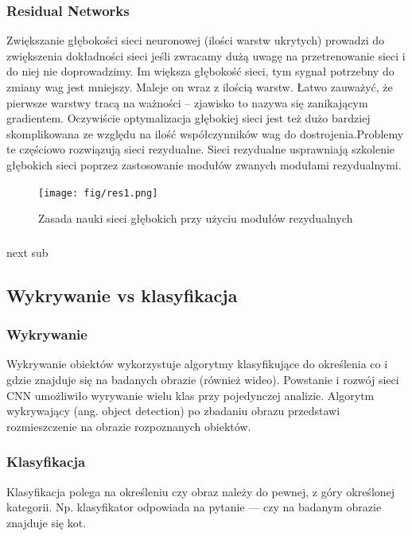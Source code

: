 \subsubsection{Residual Networks}
Zwiększanie głębokości sieci neuronowej (ilości warstw ukrytych) prowadzi do zwiększenia dokładności sieci jeśli zwracamy dużą uwagę na przetrenowanie sieci i do niej nie doprowadzimy. Im większa głębokość sieci, tym sygnał potrzebny do zmiany wag jest mniejszy. Maleje on wraz z ilością warstw. Łatwo zauważyć, że pierwsze warstwy tracą na ważności -- zjawisko to nazywa się zanikającym gradientem. Oczywiście optymalizacja głębokiej sieci jest też dużo bardziej skomplikowana ze względu na ilość współczynników wag do dostrojenia.Problemy te częściowo rozwiązują sieci rezydualne.
Sieci rezydualne usprawniają szkolenie głębokich sieci poprzez zastosowanie modułów zwanych modułami rezydualnymi.
\begin{figure}[ht]
	\centering
	\texttt{[image: fig/res1.png]}
	\caption{Zasada nauki sieci głębokich przy użyciu modułów rezydualnych}
	\label{fig:residual1}
\end{figure}

\subsubsection{}
next sub
\subsection{Wykrywanie vs klasyfikacja}

\subsubsection{Wykrywanie}
Wykrywanie obiektów wykorzystuje algorytmy klasyfikujące do określenia co i gdzie znajduje się na badanych obrazie (również wideo). Powstanie i rozwój sieci CNN umożliwiło wyrywanie wielu klas przy pojedynczej analizie. Algorytm wykrywający (ang. object detection) po zbadaniu obrazu przedstawi rozmieszczenie na obrazie rozpoznanych obiektów.

\subsubsection{Klasyfikacja}
Klasyfikacja polega na określeniu czy obraz należy do pewnej, z góry określonej kategorii. Np. klasyfikator odpowiada na pytanie --- czy na badanym obrazie znajduje się kot.